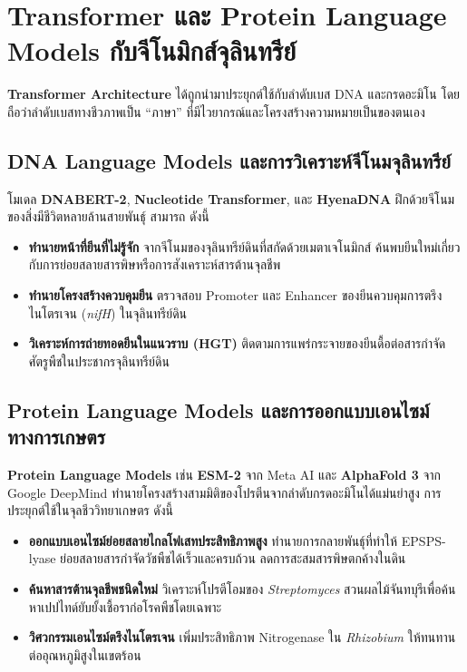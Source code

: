 \section{Transformer และ Protein Language Models กับจีโนมิกส์จุลินทรีย์}

\textbf{Transformer Architecture} ได้ถูกนำมาประยุกต์ใช้กับลำดับเบส DNA และกรดอะมิโน โดยถือว่าลำดับเบสทางชีวภาพเป็น ``ภาษา'' ที่มีไวยากรณ์และโครงสร้างความหมายเป็นของตนเอง

\subsection{DNA Language Models และการวิเคราะห์จีโนมจุลินทรีย์}

โมเดล \textbf{DNABERT-2}, \textbf{Nucleotide Transformer}, และ \textbf{HyenaDNA} ฝึกด้วยจีโนมของสิ่งมีชีวิตหลายล้านสายพันธุ์ สามารถ ดังนี้
\begin{itemize}
    \item \textbf{ทำนายหน้าที่ยีนที่ไม่รู้จัก} จากจีโนมของจุลินทรีย์ดินที่สกัดด้วยเมตาเจโนมิกส์ ค้นพบยีนใหม่เกี่ยวกับการย่อยสลายสารพิษหรือการสังเคราะห์สารต้านจุลชีพ
    \item \textbf{ทำนายโครงสร้างควบคุมยีน} ตรวจสอบ Promoter และ Enhancer ของยีนควบคุมการตรึงไนโตรเจน (\textit{nifH}) ในจุลินทรีย์ดิน
    \item \textbf{วิเคราะห์การถ่ายทอดยีนในแนวราบ (HGT)} ติดตามการแพร่กระจายของยีนดื้อต่อสารกำจัดศัตรูพืชในประชากรจุลินทรีย์ดิน
\end{itemize}

\subsection{Protein Language Models และการออกแบบเอนไซม์ทางการเกษตร}

\textbf{Protein Language Models} เช่น \textbf{ESM-2} จาก Meta AI และ \textbf{AlphaFold 3} จาก Google DeepMind ทำนายโครงสร้างสามมิติของโปรตีนจากลำดับกรดอะมิโนได้แม่นยำสูง การประยุกต์ใช้ในจุลชีววิทยาเกษตร ดังนี้
\begin{itemize}
    \item \textbf{ออกแบบเอนไซม์ย่อยสลายไกลโฟเสทประสิทธิภาพสูง} ทำนายการกลายพันธุ์ที่ทำให้ EPSPS-lyase ย่อยสลายสารกำจัดวัชพืชได้เร็วและครบถ้วน ลดการสะสมสารพิษตกค้างในดิน
    \item \textbf{ค้นหาสารต้านจุลชีพชนิดใหม่} วิเคราะห์โปรตีโอมของ \textit{Streptomyces} สวนผลไม้จันทบุรีเพื่อค้นหาเปปไทด์ยับยั้งเชื้อราก่อโรคพืชโดยเฉพาะ
    \item \textbf{วิศวกรรมเอนไซม์ตรึงไนโตรเจน} เพิ่มประสิทธิภาพ Nitrogenase ใน \textit{Rhizobium} ให้ทนทานต่ออุณหภูมิสูงในเขตร้อน
\end{itemize}

